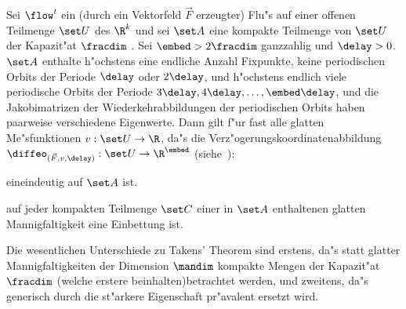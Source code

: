 \begin{theorem}
  Sei $\flow^t$ ein (durch ein Vektorfeld $\vec F$ erzeugter) Flu"s auf einer offenen Teilmenge $\set U$ des $\R^k$ und sei $\set A$
  eine kompakte Teilmenge von $\set U$ der Kapazit"at $\fracdim$ . Sei $\embed>2\fracdim$ ganzzahlig und $\delay>0$. $\set A$ enthalte
  h"ochstens eine endliche Anzahl Fixpunkte, keine periodischen Orbits der Periode
  $\delay$ oder $2\delay$, und h"ochstens endlich viele periodische Orbits der Periode
  $3\delay,4\delay,\dots,\embed\delay$, und die Jakobimatrizen der Wiederkehrabbildungen der
  periodischen Orbits haben paarweise verschiedene Eigenwerte. Dann
  gilt f"ur fast alle glatten Me"sfunktionen $v:\set U\to\R$, da"s die
  Verz"ogerungskoordinatenabbildung $\diffeo_{(\vec F,v,\delay)}:\set U\to\R^\embed$
  (siehe~): 
\begin{myitemize}
\item eineindeutig auf $\set A$ ist.
\item auf jeder kompakten Teilmenge $\set C$ einer in $\set A$ enthaltenen 
  glatten Mannigfaltigkeit eine Einbettung ist.
\end{myitemize}
\end{theorem}

Die wesentlichen Unterschiede zu Takens' Theorem sind erstens, da"s statt glatter
Mannigfaltigkeiten der Dimension $\mandim$ kompakte Mengen der Kapazit"at $\fracdim$
(welche erstere beinhalten)betrachtet werden, und zweitens, da"s generisch durch die
st"arkere Eigenschaft pr"avalent ersetzt wird.

